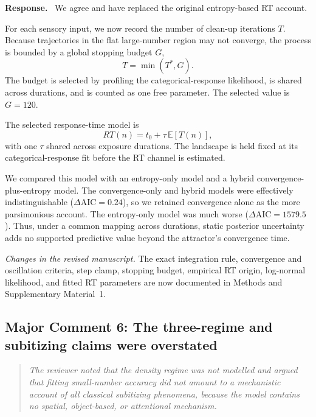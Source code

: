 \documentclass[11pt]{article}
\newenvironment{reviewercomment}{\begin{quote}\color{reviewgray}\itshape}{\end{quote}}
\newenvironment{authorresponse}{\par\noindent\textbf{\color{responseblue}Response.}\ }{\par}
\newcommand{\change}[1]{\par\noindent\textit{Changes in the revised manuscript.} #1\par}
\begin{document}
\begin{authorresponse}
We agree and have replaced the original entropy-based RT account.

For each sensory input, we now record the number of clean-up iterations $T$. Because trajectories in the flat large-number region may not converge, the process is bounded by a global stopping budget $G$,
\[
T=\min(T^*,G).
\]
The budget is selected by profiling the categorical-response likelihood, is shared across durations, and is counted as one free parameter. The selected value is $G=120$.

The selected response-time model is
\[
RT(n)=t_0+\tau\,\mathbb{E}[T(n)],
\]
with one $\tau$ shared across exposure durations. The landscape is held fixed at its categorical-response fit before the RT channel is estimated.

We compared this model with an entropy-only model and a hybrid convergence-plus-entropy model. The convergence-only and hybrid models were effectively indistinguishable ($\Delta\mathrm{AIC}=0.24$), so we retained convergence alone as the more parsimonious account. The entropy-only model was much worse ($\Delta\mathrm{AIC}=1579.5$). Thus, under a common mapping across durations, static posterior uncertainty adds no supported predictive value beyond the attractor's convergence time.
\end{authorresponse}

\change{The exact integration rule, convergence and oscillation criteria, step clamp, stopping budget, empirical RT origin, log-normal likelihood, and fitted RT parameters are now documented in Methods and Supplementary Material~1.}

\subsection*{Major Comment 6: The three-regime and subitizing claims were overstated}

\begin{reviewercomment}
The reviewer noted that the density regime was not modelled and argued that fitting small-number accuracy did not amount to a mechanistic account of all classical subitizing phenomena, because the model contains no spatial, object-based, or attentional mechanism.
\end{reviewercomment}
\end{document}
